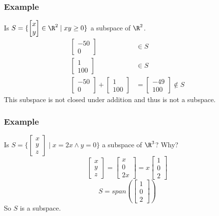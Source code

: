 \documentclass[letterpaper, 12pt]{math}
\begin{document}
\subsubsection*{Example}
Is \( S = \{\begin{bmatrix}x \\ y\end{bmatrix}\in\R^2\mid xy\ge0\} \) a subspace
of \( \R^2 \).
\begin{align*}
  \begin{bmatrix}-50 \\ 0\end{bmatrix} &\in S \\
  \begin{bmatrix}1 \\ 100\end{bmatrix} &\in S \\
  \begin{bmatrix}-50 \\ 0\end{bmatrix}+\begin{bmatrix}1 \\ 100\end{bmatrix}
    &= \begin{bmatrix}-49 \\ 100\end{bmatrix} \notin S
\end{align*}
This subspace is not closed under addition and thus is not a subspace.

\subsubsection*{Example}
Is \( S = \{\begin{bmatrix}x \\ y \\ z\end{bmatrix}\mid x = 2x \wedge y = 0 \}
\) a subspace of \( \R^3 \)? Why?
\[ \begin{bmatrix}x \\ y \\ z\end{bmatrix} =
  \begin{bmatrix}x \\ 0 \\ 2x\end{bmatrix} =
  x\begin{bmatrix}1 \\ 0 \\ 2\end{bmatrix} \]
\[ S = span(\begin{bmatrix}1 \\ 0 \\ 2\end{bmatrix}) \]
So \( S \) is a subspace.
\end{document}
